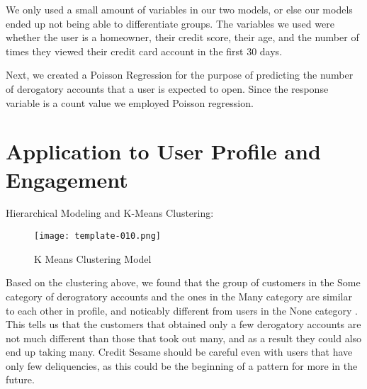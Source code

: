\documentclass[11pt]{llncs}
\begin{document}
We only used a small amount of variables in our two models, or else our models ended up not being able to differentiate groups. The variables we used were whether the user is a homeowner, their credit score, their age, and the number of times they viewed their credit card account in the first 30 days.

Next, we created a Poisson Regression for the purpose of predicting the number of derogatory accounts that a user is expected to open. Since the response variable is a count value we employed Poisson regression. 


\section{Application to User Profile and Engagement}
\label{sec:application}
{\Large Hierarchical Modeling and K-Means Clustering:}

\begin{figure}[H]
\begin{center}
\texttt{[image: template-010.png]}
\caption{K Means Clustering Model}
\end{center}
\end{figure}

Based on the clustering above, we found  that the group of customers in the Some category of derogratory accounts and the ones in the Many category are similar to each other in profile, and noticably different from users in the None category . This tells us that the customers that obtained only a few derogatory accounts are not much different than those that took out many, and as a result they could also end up taking many. Credit Sesame should be careful even with users that have only few deliquencies, as this could be the beginning of a pattern for more in the future. 
\end{document}
